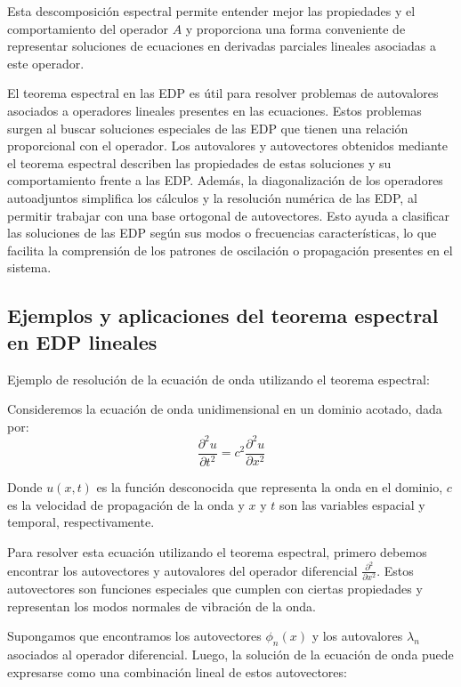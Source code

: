 \documentclass{article}
\begin{document}
    Esta descomposición espectral permite entender mejor las propiedades y el comportamiento del operador $A$ y  proporciona una forma conveniente de representar soluciones de ecuaciones en derivadas parciales lineales asociadas a este operador.
 
    El teorema espectral en las EDP es útil para resolver problemas de autovalores asociados a operadores lineales presentes en las ecuaciones. Estos problemas surgen al buscar soluciones especiales de las EDP que tienen una relación proporcional con el operador. Los autovalores y autovectores obtenidos mediante el teorema espectral describen las propiedades de estas soluciones y su comportamiento frente a las EDP. Además, la diagonalización de los operadores autoadjuntos simplifica los cálculos y la resolución numérica de las EDP, al permitir trabajar con una base ortogonal de autovectores. Esto ayuda a clasificar las soluciones de las EDP según sus modos o frecuencias características, lo que facilita la comprensión de los patrones de oscilación o propagación presentes en el sistema.

    \subsection{Ejemplos y aplicaciones del teorema espectral en EDP lineales}
    Ejemplo de resolución de la ecuación de onda utilizando el teorema espectral:

    Consideremos la ecuación de onda unidimensional en un dominio acotado, dada por:
    \begin{equation}
    \frac{{\partial^2 u}}{{\partial t^2}} = c^2 \frac{{\partial^2 u}}{{\partial x^2}}
    \end{equation}

    Donde \(u(x, t)\) es la función desconocida que representa la onda en el dominio, \(c\) es la velocidad de propagación de la onda y \(x\) y \(t\) son las variables espacial y temporal, respectivamente.
    
    Para resolver esta ecuación utilizando el teorema espectral, primero debemos encontrar los autovectores y autovalores del operador diferencial \(\frac{{\partial^2}}{{\partial x^2}}\). Estos autovectores son funciones especiales que cumplen con ciertas propiedades y representan los modos normales de vibración de la onda.
    
    Supongamos que encontramos los autovectores \(\phi_n(x)\) y los autovalores \(\lambda_n\) asociados al operador diferencial. Luego, la solución de la ecuación de onda puede expresarse como una combinación lineal de estos autovectores:
    
\end{document}
